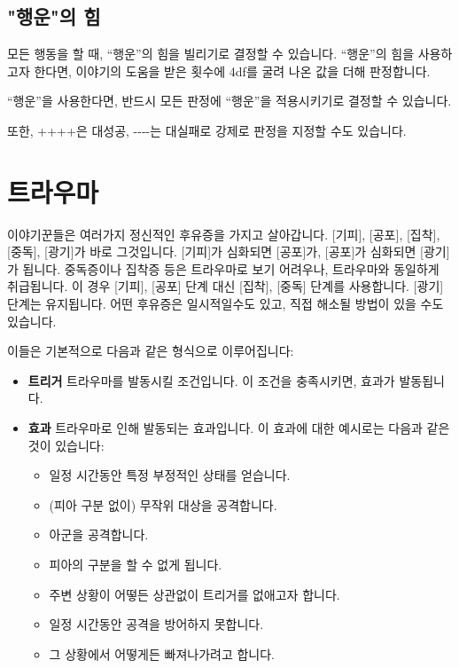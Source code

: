 \documentclass[12pt]{report}
\begin{document}
	\section*{"행운"의 힘}
	모든 행동을 할 때, “행운”의 힘을 빌리기로 결정할 수 있습니다. “행운”의 힘을 사용하고자 한다면, 이야기의 도움을 받은 횟수에 4df를 굴려 나온 값을 더해 판정합니다.
	
	“행운”을 사용한다면, 반드시 모든 판정에 “행운”을 적용시키기로 결정할 수 있습니다.
	
	또한, ++++은 대성공, -{}-{}-{}-는 대실패로 강제로 판정을 지정할 수도 있습니다.
	
	
	\chapter{트라우마}\label{트라우마}
	이야기꾼들은 여러가지 정신적인 후유증을 가지고 살아갑니다. [기피], [공포], [집착], [중독], [광기]가 바로 그것입니다. [기피]가 심화되면 [공포]가, [공포]가 심화되면 [광기]가 됩니다. 중독증이나 집착증 등은 트라우마로 보기 어려우나, 트라우마와 동일하게 취급됩니다. 이 경우 [기피], [공포] 단계 대신 [집착], [중독] 단계를 사용합니다. [광기] 단계는 유지됩니다. 어떤 후유증은 일시적일수도 있고, 직접 해소될 방법이 있을 수도 있습니다.
	
	이들은 기본적으로 다음과 같은 형식으로 이루어집니다:
	
	\begin{itemize}
	\item \textbf{트리거}
	\subitem 트라우마를 발동시킬 조건입니다. 이 조건을 충족시키면, 효과가 발동됩니다.
	
	\item \textbf{효과}
	\subitem 트라우마로 인해 발동되는 효과입니다. 이 효과에 대한 예시로는 다음과 같은 것이 있습니다:
		\begin{itemize}
			\item 일정 시간동안 특정 부정적인 상태를 얻습니다.
			\item (피아 구분 없이) 무작위 대상을 공격합니다.
			\item 아군을 공격합니다.
			\item 피아의 구분을 할 수 없게 됩니다.
			\item 주변 상황이 어떻든 상관없이 트리거를 없애고자 합니다.
			\item 일정 시간동안 공격을 방어하지 못합니다.
			\item 그 상황에서 어떻게든 빠져나가려고 합니다.
		\end{itemize}
	\end{itemize}
	
\end{document}
